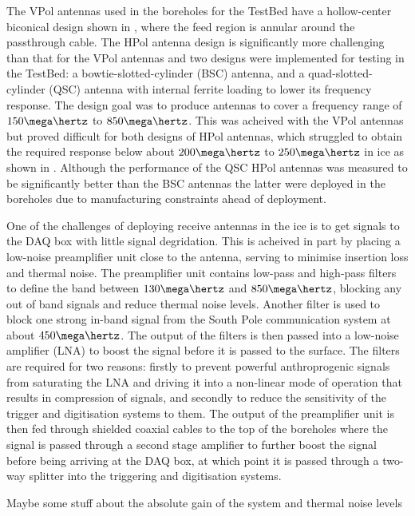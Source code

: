 The VPol antennas used in the boreholes for the TestBed have a hollow-center biconical design shown in , where the feed region is annular around the passthrough cable. The HPol antenna design is significantly more challenging than that for the VPol antennas and two designs were implemented for testing in the TestBed: a bowtie-slotted-cylinder (BSC) antenna, and a quad-slotted-cylinder (QSC) antenna with internal ferrite loading to lower its frequency response. The design goal was to produce antennas to cover a frequency range of $150 \mega \hertz$ to $850 \mega \hertz$. This was acheived with the VPol antennas but proved difficult for both designs of HPol antennas, which struggled to obtain the required response below about $200 \mega \hertz$ to $250 \mega \hertz$ in ice as shown in . Although the performance of the QSC HPol antennas was measured to be significantly better than the BSC antennas the latter were deployed in the boreholes due to manufacturing constraints ahead of deployment.


One of the challenges of deploying receive antennas in the ice is to get signals to the DAQ box with little signal degridation. This is acheived in part by placing a low-noise preamplifier unit close to the antenna, serving to minimise insertion loss and thermal noise. The preamplifier unit contains low-pass and high-pass filters to define the band between  $130 \mega \hertz$ and  $850 \mega \hertz$, blocking any out of band signals and reduce thermal noise levels. Another filter is used to block one strong in-band signal from the South Pole communication system at about $450 \mega \hertz$. The output of the filters is then passed into a low-noise amplifier (LNA) to boost the signal before it is passed to the surface. The filters are required for two reasons: firstly to prevent powerful anthroprogenic signals from saturating the LNA and driving it into a non-linear mode of operation that results in compression of signals, and secondly to reduce the sensitivity of the trigger and digitisation systems to them. The output of the preamplifier unit is then fed through shielded coaxial cables to the top of the boreholes where the signal is passed through a second stage amplifier to further boost the signal before being arriving at the DAQ box, at which point it is passed through a two-way splitter into the triggering and digitisation systems.

Maybe some stuff about the absolute gain of the system and thermal noise levels


